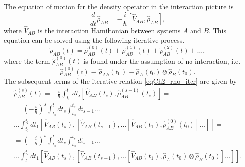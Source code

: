 The equation of motion for the density operator in the interaction picture
is
\[
\frac{d}{d t}\hat{\rho}_{AB} = 
- \frac{i}{\hbar}\left[\hat{V}_{AB}, \hat{\rho}_{AB}\right],
\]
where $\hat{V}_{AB}$ is the interaction Hamiltonian between systems $A$ 
and $B$. This equation can be solved using the following iterative process.
\begin{equation}
\hat{\rho}_{AB}\left(t\right) = 
\hat{\rho}^{(0)}_{AB}\left(t\right) +
\hat{\rho}^{(1)}_{AB}\left(t\right) +
\hat{\rho}^{(2)}_{AB}\left(t\right) + \dots,
\label{eqCh2_rho_iter}
\end{equation}
where the term \(\hat{\rho}^{(0)}_{AB}\left(t\right)\) is found under the assumption
of no interaction, i.e.
\[
\hat{\rho}^{(0)}_{AB}\left(t\right) = \hat{\rho}_{AB}\left(t_0\right) = 
\hat{\rho}_{A}\left(t_0\right)
\otimes
\hat{\rho}_{B}\left(t_0\right).
\]
The subsequent terms of the iterative relation \eqref{eqCh2_rho_iter} are given by
\begin{eqnarray}
\hat{\rho}^{(s)}_{AB}\left(t\right) = - \frac{i}{\hbar}\int_{t_0}^{t} dt_s
\left[\hat{V}_{AB}\left(t_s\right), \hat{\rho}^{(s - 1)}_{AB}\left(t_s\right)
\right] = 
\nonumber \\
= \left(- \frac{i}{\hbar}\right)^{s}\int_{t_0}^{t} dt_{s}
\int_{t_0}^{t_s} dt_{s -1} \dots
\nonumber \\
\dots \int_{t_0}^{t_2} dt_1 
\left[\hat{V}_{AB}\left(t_s\right), 
\left[\hat{V}_{AB}\left(t_{s -1}\right),
\dotsc
\left[\hat{V}_{AB}\left(t_1\right),
\hat{\rho}^{(0)}_{AB}\left(t_0\right)
\right]
\dots
\right]
\right] =
\nonumber \\
= \left(- \frac{i}{\hbar}\right)^{s}\int_{t_0}^{t} dt_{s}
\int_{t_0}^{t_{s}} dt_{s - 1} \dots
\nonumber \\
\dots \int_{t_0}^{t_2} dt_1 
\left[\hat{V}_{AB}\left(t_s\right), 
\left[\hat{V}_{AB}\left(t_{s-1}\right),
\dotsc
\left[\hat{V}_{AB}\left(t_1\right),
\hat{\rho}_{A}\left(t_0\right)
\otimes
\hat{\rho}_{B}\left(t_0\right)
\right]
\dotsc
\right]
\right].
\label{eqCh2_rho_iter_member}
\end{eqnarray}

